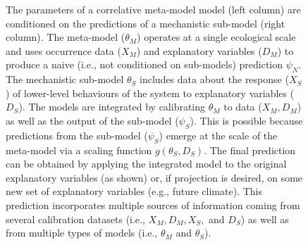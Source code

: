 \begin{figure}

\caption{The parameters of a correlative meta-model model (left column) are conditioned on the predictions of a mechanistic sub-model (right column).
The meta-model ($\theta_M$) operates at a single ecological scale and uses occurrence data (\(X_M\)) and explanatory variables ($D_M$) to produce a naive (i.e., not conditioned on sub-models) prediction $\psi_N$.
The mechanistic sub-model \(\theta_S\) includes data about the response (\(X_S\)) of lower-level behaviours of the system to explanatory variables ($D_S$). 
The models are integrated by calibrating $\theta_M$ to data ($X_M, D_M$) as well as the output of the sub-model ($\psi_S$). 
This is possible because predictions from the sub-model ($\psi_S$) emerge at the scale of the meta-model via a scaling function \(g(\theta_S, D_S)\).
The final prediction can be obtained by applying the integrated model to the original explanatory variables (as shown) or, if projection is desired, on some new set of explanatory variables (e.g., future climate).
This prediction incorporates multiple sources of information coming from several calibration datasets (i.e., $X_M, D_M, X_S, $ and $D_S$) as well as from multiple types of models (i.e., $\theta_M$ and $\theta_S$).
}
\label{fig:diagram}
\end{figure}
